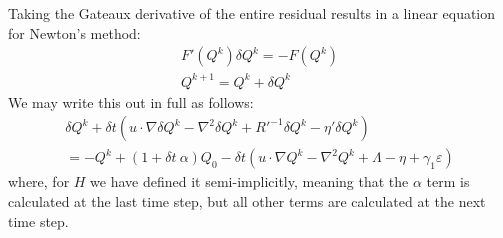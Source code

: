 \documentclass[reqno]{article}
\begin{document}
  Taking the Gateaux derivative of the entire residual results in a linear
  equation for Newton's method:
  \begin{equation}
    \begin{split}
    F'(Q^k) \delta Q^{k}
    =
    -F (Q^k) \\
    Q^{k + 1} = Q^k + \delta Q^k
    \end{split}
  \end{equation}
  We may write this out in full as follows:
  \begin{multline}
    \delta Q^k
    + \delta t \left(
      u \cdot \nabla \delta Q^k
      - \nabla^2 \delta Q^k
      + R'^{-1} \delta Q^k 
      - \eta' \delta Q^k  \right) \\
    =
    - Q^k
    + (1 + \delta t \: \alpha) Q_0
    - \delta t \left(
      u \cdot \nabla Q^k
      - \nabla^2 Q^k
      + \Lambda
      - \eta
      + \gamma_1 \varepsilon
    \right)
  \end{multline}
  where, for $H$ we have defined it semi-implicitly, meaning that the $\alpha$
  term is calculated at the last time step, but all other terms are calculated
  at the next time step.
\end{document}
